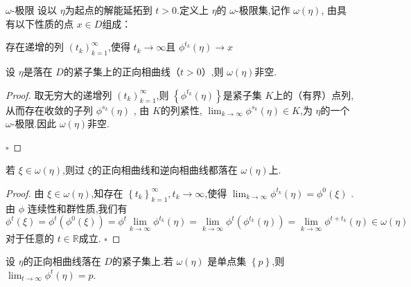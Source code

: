 \documentclass[lang=cn,12pt,color=green,fontset=none]{elegantbook}
\begin{document}
\begin{definition}{ $  \omega  $-极限 }
    设以 $ \eta  $为起点的解能延拓到 $ t>0 $.定义上 $ \eta  $的 $  \omega  $-极限集,记作 $  \omega \left( \eta  \right)  $, 由具有以下性质的点 $ x \in D $组成：
    
    存在递增的列 $ \left( t_{k} \right)_{k=1}^{\infty}  $,使得 $ t_{k}\to \infty $且 $ \phi ^{t_{k}} \left( \eta  \right)\to x $   
\end{definition}
\begin{lemma}\label{lem:ome-lim-non-empty}
    设 $ \eta  $是落在 $ D $的紧子集上的正向相曲线（$ t>0 $）,则 $  \omega \left( \eta  \right)  $非空.   
\end{lemma}
\begin{proof}
    取无穷大的递增列 $ \left( t_{k} \right)_{k=1}^{\infty}  $,则 $ \left\{ \phi ^{t_{k}} \left( \eta  \right) \right\} $是紧子集 $ K $上的（有界）点列,从而存在收敛的子列 $ \phi ^{s_{k}} \left( \eta  \right) $  ,  由 $ K $的列紧性, $ \lim_{k \to \infty}\phi ^{s_{k}} \left( \eta  \right)\in K  $,为 $ \eta  $的一个 $  \omega  $-极限.因此 $  \omega \left( \eta  \right)  $非空.     

    \hfill $\square$
\end{proof}
\begin{lemma}
    若 $  \xi  \in  \omega \left( \eta  \right)  $,则过 $  \xi  $的正向相曲线和逆向相曲线都落在 $  \omega \left( \eta  \right)  $上. 
\end{lemma}

\begin{proof}
    由 $  \xi \in  \omega \left( \eta  \right)  $,知存在 $ \left\{ t_{k} \right\}_{k=1}^{\infty}, t_{k}\to \infty $,使得 $ \lim_{k \to \infty}\phi ^{t_{k}}\left( \eta  \right) = \phi^{0} \left(  \xi  \right)   $ .由 $ \phi  $ 连续性和群性质,我们有 $$
    \phi ^{t}\left(  \xi  \right)=\phi ^{t}\left( \phi ^{0}\left(  \xi  \right)  \right)= \phi ^{t} \lim_{k \to \infty}\phi ^{t_{k}}  \left( \eta  \right) = \lim_{k \to \infty} \phi ^{t}\left( \phi ^{t_{k}}\left( \eta  \right)  \right) = \lim_{k \to \infty}\phi ^{t+ t_{k}}\left( \eta  \right) \in  \omega \left( \eta  \right)  
    $$   对于任意的 $ t \in \mathbb{R}  $成立. 
    \hfill $\square$
\end{proof}

\begin{lemma}
    设 $ \eta  $的正向相曲线落在 $ D $的紧子集上.若 $  \omega \left( \eta  \right)  $   是单点集 $ \left\{ p \right\} $,则 $ \lim_{t \to \infty}\phi ^{t}\left( \eta  \right)=p  $.  
\end{lemma}
\end{document}
